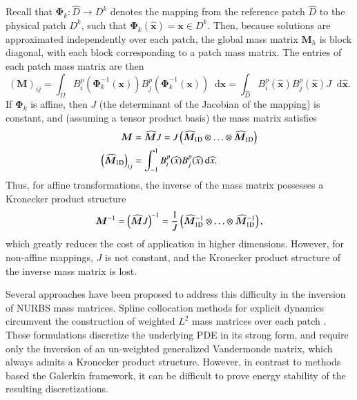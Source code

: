 \documentclass[preprint,10pt]{elsarticle}
\newcommand{\LRp}[1]{\left( #1 \right)}
\newcommand{\Dhat}{\widehat{D}}
\newcommand{\reviewerTwo}[1]{#1}
\newcommand*\diff[1]{\mathop{}\!{\mathrm{d}#1}}
\begin{document}
Recall that $\bm{\Phi}_k: \Dhat \rightarrow D^k$ denotes the mapping from the reference patch $\Dhat$ to the physical patch $D^k$, such that $\bm{\Phi}_k(\widehat{\bm{x}}) = \bm{x} \in D^k$. Then, because solutions are approximated independently over each patch, the global mass matrix $\bm{M}_h$ is block diagonal, with each block corresponding to a patch mass matrix.  The entries of each patch mass matrix are then 
\[
\LRp{\bm{M}}_{ij} =\reviewerTwo{\int_{\Omega} B^p_i(\bm{\Phi}^{-1}_k\LRp{\bm{x}})B^p_j(\bm{\Phi}^{-1}_k\LRp{\bm{x}})\diff{{\bm{x}}}} = \int_{\Dhat} B^p_i(\bm{\widehat{x}})B^p_j(\bm{\widehat{x}}) J \diff{\widehat{\bm{x}}}.  
\]
If $\bm{\Phi}_k$ is affine, then $J$  (the determinant of the Jacobian of the mapping) is constant, and (assuming a tensor product basis) the mass matrix satisfies
\begin{align*}
\bm{M} &= \widehat{\bm{M}} J = J \LRp{\widehat{\bm{M}}_{\rm 1D} \otimes \ldots \otimes \widehat{\bm{M}}_{\rm 1D}}\\
\LRp{\widehat{\bm{M}}_{\rm 1D}}_{ij} &= \int_{-1}^1 B^p_i({\widehat{x}})B^p_j({\widehat{x}}) \diff{\widehat{{x}}}.  
\end{align*}
Thus, for affine transformations, the inverse of the mass matrix possesses a Kronecker product structure
\[
\bm{M}^{-1} = \LRp{\widehat{\bm{M}}J}^{-1}  = \frac{1}{J} \LRp{\widehat{\bm{M}}^{-1}_{\rm 1D} \otimes \ldots \otimes \widehat{\bm{M}}^{-1}_{\rm 1D}},
\]
which greatly reduces the cost of application in higher dimensions.  However, for non-affine mappings, $J$ is not constant, and the Kronecker product structure of the inverse mass matrix is lost.  

Several approaches have been proposed to address this difficulty in the inversion of NURBS mass matrices.  Spline collocation methods for explicit dynamics circumvent the construction of weighted $L^2$ mass matrices over each patch \cite{auricchio2012isogeometric}.  These formulations discretize the underlying PDE in its strong form, and require only the inversion of an un-weighted generalized Vandermonde matrix, which always admits a Kronecker product structure.  However, in contrast to methods based the Galerkin framework, it can be difficult to prove energy stability of the resulting discretizations.  
\end{document}
